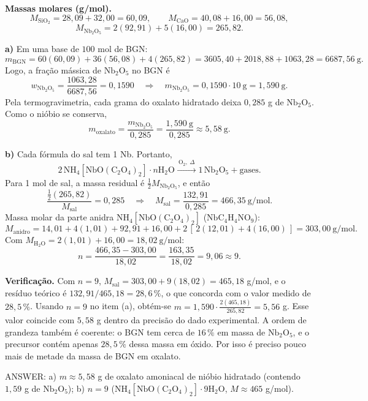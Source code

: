 \documentclass{article}%
\begin{document}
\textbf{Massas molares (g/mol).}
\[
M_{\mathrm{SiO_2}} = 28{,}09 + 32{,}00 = 60{,}09,\qquad M_{\mathrm{CaO}} = 40{,}08 + 16{,}00 = 56{,}08,
\]
\[
M_{\mathrm{Nb_2O_5}} = 2(92{,}91) + 5(16{,}00) = 265{,}82 .
\]

\textbf{a)} Em uma base de $100$ mol de BGN:
\[
m_{\text{BGN}} = 60(60{,}09) + 36(56{,}08) + 4(265{,}82) = 3605{,}40 + 2018{,}88 + 1063{,}28 = 6687{,}56\ \mathrm{g}.
\]
Logo, a fração mássica de $\mathrm{Nb_2O_5}$ no BGN é
\[
w_{\mathrm{Nb_2O_5}} = \frac{1063{,}28}{6687{,}56} = 0{,}1590
\quad\Rightarrow\quad
m_{\mathrm{Nb_2O_5}} = 0{,}1590 \cdot 10\ \mathrm{g} = 1{,}590\ \mathrm{g}.
\]
Pela termogravimetria, cada grama do oxalato hidratado deixa $0{,}285$ g de $\mathrm{Nb_2O_5}$. Como o nióbio se conserva,
\[
m_{\text{oxalato}} = \frac{m_{\mathrm{Nb_2O_5}}}{0{,}285} = \frac{1{,}590\ \mathrm{g}}{0{,}285} \approx 5{,}58\ \mathrm{g}.
\]

\textbf{b)} Cada fórmula do sal tem 1 Nb. Portanto,
\[
2\,\mathrm{NH_4[NbO(C_2O_4)_2]}\cdot n\mathrm{H_2O} \xrightarrow{\ \mathrm{O_2},\ \Delta\ } 1\,\mathrm{Nb_2O_5} + \text{gases}.
\]
Para 1 mol de sal, a massa residual é $\tfrac{1}{2}M_{\mathrm{Nb_2O_5}}$, e então
\[
\frac{\tfrac{1}{2}(265{,}82)}{M_{\text{sal}}} = 0{,}285
\quad\Rightarrow\quad
M_{\text{sal}} = \frac{132{,}91}{0{,}285} = 466{,}35\ \mathrm{g/mol}.
\]
Massa molar da parte anidra $\mathrm{NH_4[NbO(C_2O_4)_2]}$ ($\mathrm{NbC_4H_4NO_9}$):
\[
M_{\text{anidro}} = 14{,}01 + 4(1{,}01) + 92{,}91 + 16{,}00 + 2\,[\,2(12{,}01) + 4(16{,}00)\,] = 303{,}00\ \mathrm{g/mol}.
\]
Com $M_{\mathrm{H_2O}} = 2(1{,}01) + 16{,}00 = 18{,}02\ \mathrm{g/mol}$:
\[
n = \frac{466{,}35 - 303{,}00}{18{,}02} = \frac{163{,}35}{18{,}02} = 9{,}06 \approx 9 .
\]

\textbf{Verificação.} Com $n = 9$, $M_{\text{sal}} = 303{,}00 + 9(18{,}02) = 465{,}18$ g/mol, e o resíduo teórico é $132{,}91/465{,}18 = 28{,}6\,\%$, o que concorda com o valor medido de $28{,}5\,\%$. Usando $n = 9$ no item (a), obtém-se $m = 1{,}590 \cdot \tfrac{2(465{,}18)}{265{,}82} = 5{,}56$ g. Esse valor coincide com $5{,}58$ g dentro da precisão do dado experimental. A ordem de grandeza também é coerente: o BGN tem cerca de $16\,\%$ em massa de $\mathrm{Nb_2O_5}$, e o precursor contém apenas $28{,}5\,\%$ dessa massa em óxido. Por isso é preciso pouco mais de metade da massa de BGN em oxalato.

ANSWER: a) $m \approx 5{,}58$ g de oxalato amoniacal de nióbio hidratado (contendo $1{,}59$ g de $\mathrm{Nb_2O_5}$); b) $n = 9$ ($\mathrm{NH_4[NbO(C_2O_4)_2]}\cdot 9\mathrm{H_2O}$, $M \approx 465$ g/mol).%
\newpage%
\end{document}
